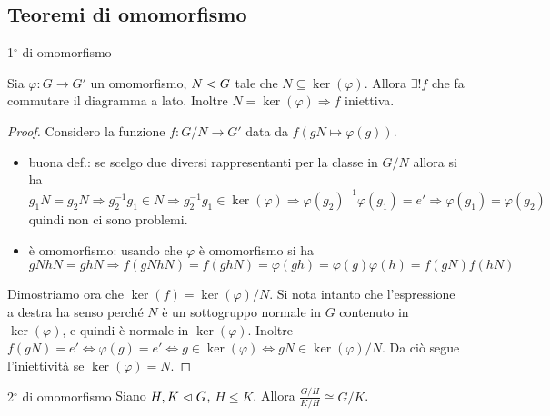 \subsection{Teoremi di omomorfismo}
\begin{theorem}{1$^{\circ}$ di omomorfismo}
    \newline
    \begin{minipage}{0.7\textwidth}
    Sia $\varphi : G \rightarrow G'$ un omomorfismo, $N \vartriangleleft G$ tale che $N \subseteq \ker(\varphi)$. Allora $\exists ! f$ che fa commutare il diagramma a lato. Inoltre $N = \ker(\varphi) \Rightarrow f$ iniettiva.
    \end{minipage}\hfill\hfill
    \begin{minipage}{0.1\textwidth}  
    \end{minipage}\hfill
    \begin{minipage}{0.2\textwidth}  
    \end{minipage}\hfill
\end{theorem}
\begin{proof}
    Considero la funzione $f : G/N \rightarrow G'$ data da $f(gN\mapsto \varphi(g))$.
    \begin{itemize}
        \item buona def.: se scelgo due diversi rappresentanti per la classe in $G/N$  allora si ha $g_1N = g_2N \Rightarrow g_2^{-1}g_1 \in N \Rightarrow g_2^{-1}g_1 \in \ker(\varphi) \Rightarrow \varphi(g_2)^{-1}\varphi(g_1) = e' \Rightarrow \varphi(g_1) = \varphi(g_2)$ quindi non ci sono problemi.
        \item è omomorfismo: usando che $\varphi$ è omomorfismo si ha $gNhN = ghN \Rightarrow f(gNhN) = f(ghN) = \varphi(gh) = \varphi(g)\varphi(h) = f(gN)f(hN)$ 
    \end{itemize}
    Dimostriamo ora che $\ker(f) = \ker(\varphi)/N$. Si nota intanto che l'espressione a destra ha senso perché $N$ è un sottogruppo normale in $G$ contenuto in $\ker(\varphi)$, e quindi è normale in $\ker(\varphi)$. Inoltre $f(gN) = e' \iff \varphi(g) = e' \iff g \in \ker(\varphi) \iff gN \in \ker(\varphi)/N$. Da ciò segue l'iniettività se $\ker(\varphi)= N$.
\end{proof}
\begin{theorem}{2$^{\circ}$ di omomorfismo}
    Siano $H,K \vartriangleleft G$, $H \leq K$. Allora $\frac{G/H}{K/H} \cong G/K$.
\end{theorem}
